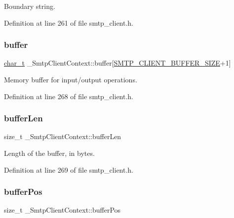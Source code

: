 Boundary string. 



Definition at line 261 of file smtp\+\_\+client.\+h.

\mbox{\label{struct__SmtpClientContext_a4b2eee830af1e3129cf7e5b924172895}} 
\subsubsection{\texorpdfstring{buffer}{buffer}}
{\footnotesize\ttfamily \hyperlink{compiler__port_8h_a40bb5262bf908c328fbcfbe5d29d0201}{char\+\_\+t} \+\_\+\+Smtp\+Client\+Context\+::buffer\mbox{[}\hyperlink{smtp__client_8h_a55cbd4c03a87f28df130203250a61810}{S\+M\+T\+P\+\_\+\+C\+L\+I\+E\+N\+T\+\_\+\+B\+U\+F\+F\+E\+R\+\_\+\+S\+I\+ZE}+1\mbox{]}}



Memory buffer for input/output operations. 



Definition at line 268 of file smtp\+\_\+client.\+h.

\mbox{\label{struct__SmtpClientContext_a749fb7b9249105b493ae7e63623e6e04}} 
\subsubsection{\texorpdfstring{buffer\+Len}{bufferLen}}
{\footnotesize\ttfamily size\+\_\+t \+\_\+\+Smtp\+Client\+Context\+::buffer\+Len}



Length of the buffer, in bytes. 



Definition at line 269 of file smtp\+\_\+client.\+h.

\mbox{\label{struct__SmtpClientContext_ae276846168abb52ec32644fe33dc8ec0}} 
\subsubsection{\texorpdfstring{buffer\+Pos}{bufferPos}}
{\footnotesize\ttfamily size\+\_\+t \+\_\+\+Smtp\+Client\+Context\+::buffer\+Pos}



